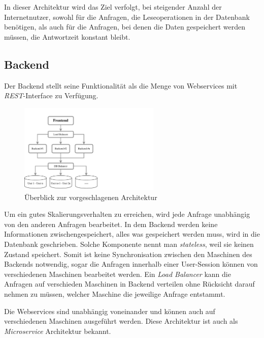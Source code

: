 In dieser Architektur wird das Ziel verfolgt, bei steigender Anzahl der Internetnutzer, sowohl für die Anfragen, die Leseoperationen in der Datenbank benötigen, als auch für die Anfragen, bei denen die Daten gespeichert werden müssen, die Antwortzeit konstant bleibt.

\subsection{Backend}

Der Backend stellt seine Funktionalität als die Menge von Webservices mit \textit{REST}-Interface zu Verfügung.

\begin{figure}[H]
\centering
\includegraphics[trim = 0mm 0mm 0mm 0mm, clip, width=0.60\textwidth]{resources/ueberblickArchitektur}
\caption[Überblick zur vorgeschlagenen Architektur]{Überblick zur vorgeschlagenen Architektur}
\label{img:ueberblickArchitektur}
\end{figure}

Um ein gutes Skalierungsverhalten zu erreichen, wird jede Anfrage unabhängig von den anderen Anfragen bearbeitet. In dem Backend werden keine Informationen zwischengespeichert, alles was gespeichert werden muss, wird in die Datenbank geschrieben. Solche Komponente nennt man \textit{stateless}, weil sie keinen Zustand speichert. Somit ist keine Synchronisation zwischen den Maschinen des Backends notwendig, sogar die Anfragen innerhalb einer User-Session können von verschiedenen Maschinen bearbeitet werden. Ein \textit{Load Balancer} kann die Anfragen auf verschieden Maschinen in Backend verteilen ohne Rücksicht darauf nehmen zu müssen, welcher Maschine die jeweilige Anfrage entstammt.

Die Webservices sind unabhängig voneinander und können auch auf verschiedenen Maschinen ausgeführt werden. Diese Architektur ist auch als \textit{Microservice} Architektur bekannt.

